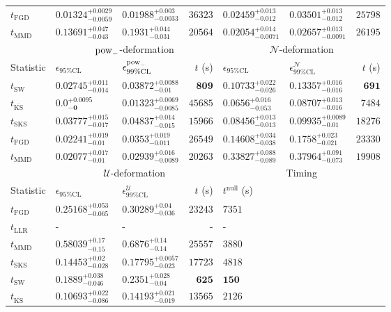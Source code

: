 \begin{tabular}{l|llr|llr}
	$t_{\mathrm{FGD}}$ & ${\mathbf{0.01324_{-0.0059}^{+0.0029}}}$ & ${\mathbf{0.01988_{-0.0033}^{+0.003}}}$ & $36323$ & $0.02459_{-0.012}^{+0.013}$ & $0.03501_{-0.012}^{+0.013}$ & $25798$ \\
	$t_{\mathrm{MMD}}$ & $0.13691_{-0.043}^{+0.047}$ & $0.1931_{-0.031}^{+0.044}$ & $20564$ & $0.02054_{-0.0071}^{+0.014}$ & $0.02657_{-0.0091}^{+0.013}$ & $26195$ \\
	\toprule
	\multicolumn{1}{c}{} & \multicolumn{3}{c}{$\rm{pow}_{-}$-deformation} & \multicolumn{3}{c}{$\mathcal{N}$-deformation} \\
	Statistic & $\epsilon_{95\%\mathrm{CL}}$ & $\epsilon^  {\rm{pow}_{-}}_{99\%\mathrm{CL}}$ & $t$ (s) & $\epsilon_{95\%\mathrm{CL}}$ & $\epsilon^    {\mathcal{N}}_{99\%\mathrm{CL}}$ & $t$ (s) \\
	\midrule
	$t_{\mathrm{SW}}$ & $0.02745_{-0.014}^{+0.011}$ & $0.03872_{-0.01}^{+0.0088}$ & ${\mathbf{809}}$ & $0.10733_{-0.026}^{+0.022}$ & $0.13357_{-0.016}^{+0.016}$ & ${\mathbf{691}}$ \\
	$t_{\overline{\mathrm{KS}}}$ & ${\mathbf{0.0_{-0}^{+0.0095}}}$ & ${\mathbf{0.01323_{-0.0085}^{+0.0069}}}$ & $45685$ & ${\mathbf{0.0656_{-0.053}^{+0.016}}}$ & ${\mathbf{0.08707_{-0.016}^{+0.013}}}$ & $7484$ \\
	$t_{\mathrm{SKS}}$ & $0.03777_{-0.017}^{+0.015}$ & $0.04837_{-0.015}^{+0.014}$ & $15966$ & $0.08456_{-0.013}^{+0.013}$ & $0.09935_{-0.01}^{+0.0089}$ & $18276$ \\
	$t_{\mathrm{FGD}}$ & $0.02241_{-0.01}^{+0.019}$ & $0.0353_{-0.011}^{+0.019}$ & $26549$ & $0.14608_{-0.038}^{+0.034}$ & $0.1758_{-0.021}^{+0.023}$ & $23330$ \\
	$t_{\mathrm{MMD}}$ & $0.02077_{-0.01}^{+0.017}$ & $0.02939_{-0.0089}^{+0.016}$ & $20263$ & $0.33827_{-0.089}^{+0.088}$ & $0.37964_{-0.073}^{+0.091}$ & $19908$ \\
	\toprule
	\multicolumn{1}{c}{} & \multicolumn{3}{c}{$\mathcal{U}$-deformation} & \multicolumn{3}{c}{Timing} \\
	Statistic & $\epsilon_{95\%\mathrm{CL}}$ & $\epsilon^    {\mathcal{U}}_{99\%\mathrm{CL}}$ & $t$ (s) & $t^{\mathrm{null}}$ (s) \\
	\midrule
	$t_{\mathrm{FGD}}$ & $0.25168_{-0.065}^{+0.053}$ & $0.30289_{-0.036}^{+0.04}$ & $23243$ & $7351$ \\
	$t_{\mathrm{LLR}}$ & - & - & - & - \\
	$t_{\mathrm{MMD}}$ & $0.58039_{-0.15}^{+0.17}$ & $0.6876_{-0.14}^{+0.14}$ & $25557$ & $3880$ \\
	$t_{\mathrm{SKS}}$ & $0.14453_{-0.028}^{+0.02}$ & $0.17795_{-0.023}^{+0.0057}$ & $17723$ & $4818$ \\
	$t_{\mathrm{SW}}$ & $0.1889_{-0.046}^{+0.038}$ & $0.2351_{-0.04}^{+0.028}$ & ${\mathbf{625}}$ & ${\mathbf{150}}$ \\
	$t_{\overline{\mathrm{KS}}}$ & ${\mathbf{0.10693_{-0.086}^{+0.022}}}$ & ${\mathbf{0.14193_{-0.019}^{+0.021}}}$ & $13565$ & $2126$ \\
	\bottomrule
\end{tabular}